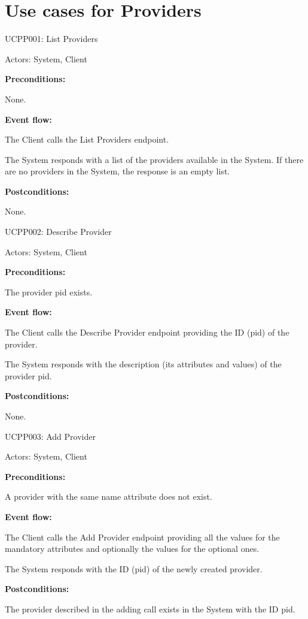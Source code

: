 \section{Use cases for Providers}

\begin{ucbox}{UCPP001: List Providers}
\label{UCPP001}

Actors: System, Client

\textbf{Preconditions:}

\ucitem None.

\textbf{Event flow:}

\ucitem The Client calls the List Providers endpoint.

\ucitem The System responds with a list of the providers available in the System. If there are no providers in the System, the response is an empty list.

\textbf{Postconditions:}

\ucitem None.

\end{ucbox}

\begin{ucbox}{UCPP002: Describe Provider}
\label{UCPP002}

Actors: System, Client

\textbf{Preconditions:}

\ucitem The provider pid exists.

\textbf{Event flow:}

\ucitem The Client calls the Describe Provider endpoint providing the ID (pid) of the provider.

\ucitem The System responds with the description (its attributes and values) of the provider pid.

\textbf{Postconditions:}

\ucitem None.

\end{ucbox}

\begin{ucbox}{UCPP003: Add Provider}
\label{UCPP003}

Actors: System, Client

\textbf{Preconditions:}

\ucitem A provider with the same name attribute does not exist.

\textbf{Event flow:}

\ucitem The Client calls the Add Provider endpoint providing all the values for the mandatory attributes and optionally the values for the optional ones.

\ucitem The System responds with the ID (pid) of the newly created provider.

\textbf{Postconditions:}

\ucitem The provider described in the adding call exists in the System with the ID pid.

\end{ucbox}

